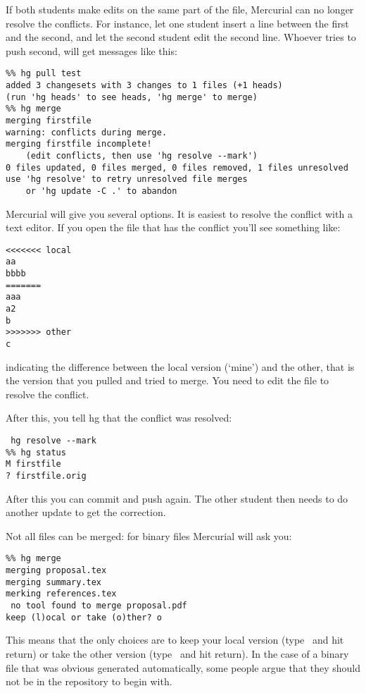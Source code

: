 
If both students make edits on the same part of the file, Mercurial can no
longer resolve the conflicts. For instance, let one student insert a
line between the first and the second, and let the second student edit
the second line. Whoever tries to push second, will get messages
like this:
{\small
\begin{verbatim}
%% hg pull test
added 3 changesets with 3 changes to 1 files (+1 heads)
(run 'hg heads' to see heads, 'hg merge' to merge)
%% hg merge
merging firstfile
warning: conflicts during merge.
merging firstfile incomplete! 
    (edit conflicts, then use 'hg resolve --mark')
0 files updated, 0 files merged, 0 files removed, 1 files unresolved
use 'hg resolve' to retry unresolved file merges 
    or 'hg update -C .' to abandon
\end{verbatim}
}
Mercurial will give you several options. It is easiest to resolve the
conflict with a text editor. If you open the file that has the conflict
you'll see something like:
\begin{verbatim}
<<<<<<< local
aa
bbbb
=======
aaa
a2
b
>>>>>>> other
c
\end{verbatim}
indicating the difference between the local version (`mine') and the
other, that is the version that you pulled and tried to merge.
You need to edit the file to resolve the conflict.

After this, you tell hg that the conflict was resolved:
\begin{verbatim}
 hg resolve --mark
%% hg status
M firstfile
? firstfile.orig
\end{verbatim}
After this you can commit and push again.
The other student then needs to do another update to get the
correction.

Not all files can be merged: for binary files Mercurial will ask you:
\begin{verbatim}
%% hg merge
merging proposal.tex
merging summary.tex
merking references.tex
 no tool found to merge proposal.pdf
keep (l)ocal or take (o)ther? o
\end{verbatim}
This means that the only choices are to keep your local version
(type~ and hit return) or take the other version (type~ and
hit return). In the case of a binary file that was obvious generated
automatically, some people argue that they should not be in the
repository to begin with.

